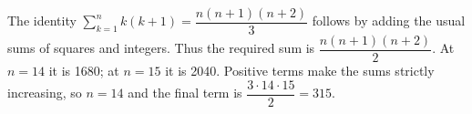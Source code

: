 The identity $\sum_{k=1}^n k(k+1)=\dfrac{n(n+1)(n+2)}{3}$ follows by adding the usual sums of squares and integers. Thus the required sum is $\dfrac{n(n+1)(n+2)}{2}$. At $n=14$ it is 1680; at $n=15$ it is 2040. Positive terms make the sums strictly increasing, so $n=14$ and the final term is $\dfrac{3\cdot 14\cdot 15}{2}=\boxed{315}$.
